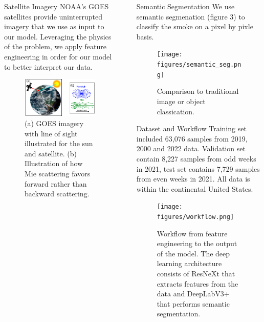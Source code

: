 \documentclass[final,16pt]{beamer}
\newlength{\sepwidth}
\newlength{\colwidth}
\newcommand{\separatorcolumn}{\begin{column}{\sepwidth}\end{column}}
\begin{document}
\begin{frame}[t]
\begin{columns}[t]
\begin{column}{\colwidth}
  \begin{block}{Satellite Imagery}
    NOAA’s GOES satellites provide uninterrupted imagery that we use as input to our model. Leveraging the physics of the problem, we apply feature engineering in order for our model to better interpret our data.
    \begin{figure}
      \centering
      \includegraphics[width=33cm]{figures/LOS_scattering.png}
      \caption{(a) GOES imagery with line of sight illustrated for the sun and satellite. (b) Illustration of how Mie scattering favors forward rather than backward scattering.}
    \end{figure}

  \end{block}

\end{column}

\separatorcolumn

\begin{column}{\colwidth}

  \begin{block}{Semantic Segmentation}
    We use semantic segmenation (figure 3) to classify the smoke on a pixel by pixle basis.
    \begin{figure}
      \centering
      \texttt{[image: figures/semantic\_seg.png]}
      \caption{Comparison to traditional image or object classication.}
    \end{figure}
  \end{block}

  \begin{block}{Dataset and Workflow}
    Training set included 63,076 samples from 2019, 2000 and 2022 data. Validation set contain 8,227 samples from odd weeks in 2021, test set contains 7,729 samples from even weeks in 2021. All data is within the continental United States.
    \begin{figure}
      \centering
      \texttt{[image: figures/workflow.png]}
      \caption{Workflow from feature engineering to the output of the model. The deep learning architecture consists of ResNeXt \cite{resnext} that extracts features from the data and DeepLabV3+ \cite{deeplab} that performs semantic segmentation.}
    \end{figure}
  \end{block}


\end{column}
\end{columns}
\end{frame}
\end{document}
